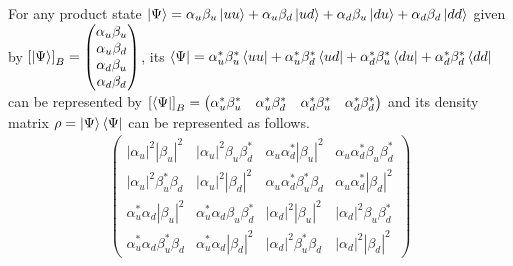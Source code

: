 For any product state $\ket{\Psi} = \alpha_u \beta_u \ket{u u} + \alpha_u \beta_d \ket{u d} + \alpha_d \beta_u \ket{d u} + \alpha_d \beta_d \ket{d d}$ given by $\left[\ket{\Psi}\right]_B = \begin{pmatrix} \alpha_u \beta_u \\ \alpha_u \beta_d \\ \alpha_d \beta_u \\ \alpha_d \beta_d \end{pmatrix}$, its $\bra{\Psi} = \alpha_u^* \beta_u^* \bra{u u} + \alpha_u^* \beta_d^* \bra{u d} + \alpha_d^* \beta_u^* \bra{d u} + \alpha_d^* \beta_d^* \bra{d d}$ can be represented by $\left[\bra{\Psi}\right]_B = \begin{pmatrix} \alpha_u^* \beta_u^* & \alpha_u^* \beta_d^* & \alpha_d^* \beta_u^* & \alpha_d^* \beta_d^* \end{pmatrix}$ and its density matrix $\rho = \ket{\Psi} \bra{\Psi}$ can be represented as follows.
\begin{align*}
	\begin{pmatrix}
		|\alpha_u|^2 |\beta_u|^2 & |\alpha_u|^2 \beta_u \beta_d^* & \alpha_u \alpha_d^* |\beta_u|^2 & \alpha_u \alpha_d^* \beta_u \beta_d^* \\ |\alpha_u|^2 \beta_u^* \beta_d & |\alpha_u|^2 |\beta_d|^2 & \alpha_u \alpha_d^* \beta_u^* \beta_d & \alpha_u \alpha_d^* |\beta_d|^2 \\ \alpha_u^* \alpha_d |\beta_u|^2 & \alpha_u^* \alpha_d \beta_u \beta_d^* & |\alpha_d|^2 |\beta_u|^2 & |\alpha_d|^2 \beta_u \beta_d^* \\ \alpha_u^* \alpha_d \beta_u^* \beta_d & \alpha_u^* \alpha_d |\beta_d|^2 & |\alpha_d|^2 \beta_u^* \beta_d & |\alpha_d|^2 |\beta_d|^2
	\end{pmatrix}
\end{align*}

